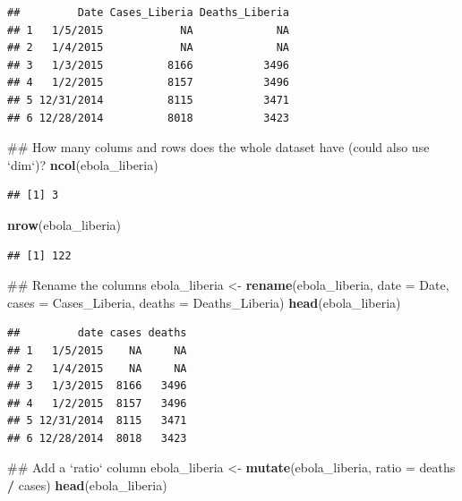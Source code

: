 \documentclass[]{book}
\makeatletter
\newenvironment{Shaded}{\begin{snugshade}}{\end{snugshade}}
\newcommand{\KeywordTok}[1]{\textcolor[rgb]{0.13,0.29,0.53}{\textbf{#1}}}
\newcommand{\DataTypeTok}[1]{\textcolor[rgb]{0.13,0.29,0.53}{#1}}
\newcommand{\StringTok}[1]{\textcolor[rgb]{0.31,0.60,0.02}{#1}}
\newcommand{\OperatorTok}[1]{\textcolor[rgb]{0.81,0.36,0.00}{\textbf{#1}}}
\newcommand{\NormalTok}[1]{#1}
\newenvironment{kframe}{%
\medskip{}
\setlength{\fboxsep}{.8em}
 \def\at@end@of@kframe{}%
 \ifinner\ifhmode%
  \def\at@end@of@kframe{\end{minipage}}%
  \begin{minipage}{\columnwidth}%
 \fi\fi%
 \def\FrameCommand##1{\hskip\@totalleftmargin \hskip-\fboxsep
 \colorbox{shadecolor}{##1}\hskip-\fboxsep
     \hskip-\linewidth \hskip-\@totalleftmargin \hskip\columnwidth}%
 \MakeFramed {\advance\hsize-\width
   \@totalleftmargin\z@ \linewidth\hsize
   \@setminipage}}%
 {\par\unskip\endMakeFramed%
 \at@end@of@kframe}
\renewenvironment{Shaded}{\begin{kframe}}{\end{kframe}}
\theoremstyle{definition}
\theoremstyle{definition}
\theoremstyle{definition}
\theoremstyle{remark}
\makeatother
\begin{document}
\begin{verbatim}
##         Date Cases_Liberia Deaths_Liberia
## 1   1/5/2015            NA             NA
## 2   1/4/2015            NA             NA
## 3   1/3/2015          8166           3496
## 4   1/2/2015          8157           3496
## 5 12/31/2014          8115           3471
## 6 12/28/2014          8018           3423
\end{verbatim}

\begin{Shaded}
\begin{Highlighting}[]
\NormalTok{## How many colums and rows does the whole dataset have (could also use `dim`)?}
\KeywordTok{ncol}\NormalTok{(ebola_liberia)}
\end{Highlighting}
\end{Shaded}

\begin{verbatim}
## [1] 3
\end{verbatim}

\begin{Shaded}
\begin{Highlighting}[]
\KeywordTok{nrow}\NormalTok{(ebola_liberia)}
\end{Highlighting}
\end{Shaded}

\begin{verbatim}
## [1] 122
\end{verbatim}

\begin{Shaded}
\begin{Highlighting}[]
\NormalTok{## Rename the columns}
\NormalTok{ebola_liberia <-}\StringTok{ }\KeywordTok{rename}\NormalTok{(ebola_liberia,}
                        \DataTypeTok{date =}\NormalTok{ Date,}
                        \DataTypeTok{cases =}\NormalTok{ Cases_Liberia,}
                        \DataTypeTok{deaths =}\NormalTok{ Deaths_Liberia)}
\KeywordTok{head}\NormalTok{(ebola_liberia)}
\end{Highlighting}
\end{Shaded}

\begin{verbatim}
##         date cases deaths
## 1   1/5/2015    NA     NA
## 2   1/4/2015    NA     NA
## 3   1/3/2015  8166   3496
## 4   1/2/2015  8157   3496
## 5 12/31/2014  8115   3471
## 6 12/28/2014  8018   3423
\end{verbatim}

\begin{Shaded}
\begin{Highlighting}[]
\NormalTok{## Add a `ratio` column}
\NormalTok{ebola_liberia <-}\StringTok{ }\KeywordTok{mutate}\NormalTok{(ebola_liberia, }\DataTypeTok{ratio =}\NormalTok{ deaths }\OperatorTok{/}\StringTok{ }\NormalTok{cases)}
\KeywordTok{head}\NormalTok{(ebola_liberia)}
\end{Highlighting}
\end{Shaded}
\end{document}

